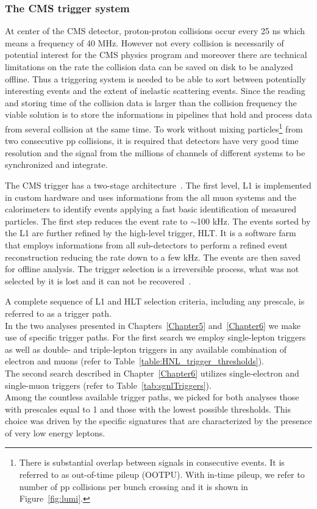 \clearpage
\subsubsection{The CMS trigger system}\label{sec:triggersystem}

At center of the CMS detector, proton-proton collisions occur every
25 ns which means a frequency of 40 MHz. However not every collision is
necessarily of potential interest for the CMS physics program and
moreover there are technical limitations on the rate the collision data can be
saved on disk to be analyzed offline. Thus a triggering system is needed to be
able to sort between potentially interesting events and the extent of
inelastic scattering events.
Since the reading and storing time of the collision data is larger
than the collision frequency the viable solution is
to store the informations in pipelines that hold and process data
from several collision at the same time.
To work without mixing particles\footnote{There is substantial
overlap between signals in consecutive events. It is referred to as
out-of-time pileup (OOTPU). With in-time pileup, we refer to number of
pp collisions per bunch crossing and it is shown in Figure~\ref{fig:lumi}.} from two consecutive pp collisions, it is
required that detectors have very good time
resolution and the signal from the millions of channels of different
systems to be synchronized and integrate.

The CMS trigger has a two-stage architecture~\cite{Khachatryan_2017}. The first level, L1 is
implemented in custom hardware and uses informations from the 
all muon systems and the calorimeters to identify events applying a fast
basic identification of measured particles. The first step reduces the
event rate to $\sim$100 kHz. The events sorted by the L1 are further refined by the
high-level trigger, HLT. It is a software farm that employs informations from all sub-detectors to perform a
refined event reconstruction reducing the rate down to a few kHz. The 
events are then saved for offline analysis.
The trigger selection is a irreversible process, what was not selected
by it is lost and it can not be recovered~\cite{Khachatryan_2017}.

A complete sequence of L1
and HLT selection criteria, including any prescale, is referred to
as a trigger path.\\

In the two analyses presented in Chapters~\ref{Chapter5}
and~\ref{Chapter6} we make use of specific trigger paths. For the
first search we employ single-lepton triggers as well as double- and
triple-lepton triggers in any available combination of electron and
muons (refer to Table~\ref{table:HNL_trigger_thresholds}).\\
The second search described in Chapter~\ref{Chapter6} utilizes
single-electron and single-muon triggers (refer to
Table~\ref{tab:sgnlTriggers}).\\
Among the countless available trigger paths, we picked for both
analyses those with prescales equal to 1 and those with the
lowest possible \pt thresholds. This choice was driven by the specific signatures
that are characterized by the presence of very low energy leptons.

